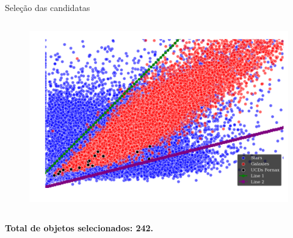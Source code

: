 \begin{frame}[c]{Seleção das candidatas}
\begin{columns}[c]
\begin{column}{0.32\linewidth}
\begin{figure}
            \includegraphics[width=\linewidth]{images/f_70_20_f_90_70.png}
        \end{figure}
    \end{column}
\end{columns}

\begin{center}
    \footnotesize
    \textbf{Total de objetos selecionados: 242.}
\end{center}

\end{frame}

